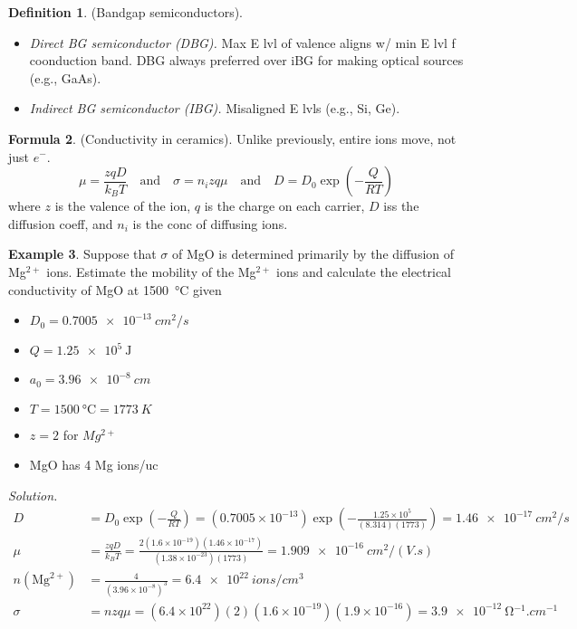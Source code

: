 \documentclass{article}
\theoremstyle{definition}
\newtheorem{definition}{Definition}[section]
\newtheorem{formula}[definition]{Formula}
\newtheorem{example}[definition]{Example}
\begin{document}
\begin{definition}
    (Bandgap semiconductors).
    \begin{itemize}
        \item \textit{Direct BG semiconductor (DBG).} Max E lvl of valence aligns w/ min E lvl f coonduction band. DBG always preferred over iBG for making optical sources (e.g., GaAs).
        \item \textit{Indirect BG semiconductor (IBG).} Misaligned E lvls (e.g., Si, Ge).
    \end{itemize}
\end{definition}

\begin{formula}
    (Conductivity in ceramics). Unlike previously, entire ions move, not just $e^-$.
    \begin{equation}
        \mu = \frac{zqD}{k_B T} \quad \text{and} \quad \sigma = n_i zq \mu \quad \text{and} \quad D = D_0 \exp \left( -\frac{Q}{RT} \right)
    \end{equation}
    where $z$ is the valence of the ion, $q$ is the charge on each carrier, $D$ iss the diffusion coeff, and $n_i$ is the conc of diffusing ions.
\end{formula}

\begin{example}
    Suppose that $\sigma$ of MgO is determined primarily by the diffusion of Mg$^{2+}$ ions. Estimate the mobility of the Mg$^{2+}$ ions and calculate the electrical conductivity of MgO at \SI{1500}{\celsius} given
    \begin{multicols}{3}
        \begin{itemize}
            \item $D_0 = \SI{0.7005e-13}{cm^2/s}$
            \item $Q = \SI{1.25e5}{\joule}$
            \item $a_0 = \SI{3.96e-8}{cm}$
            \item $T = \SI{1500}{\celsius} = \SI{1773}{K}$
            \item $z = 2$ for $Mg^{2+}$
            \item MgO has 4 Mg ions/uc
        \end{itemize}
    \end{multicols}
    \textit{Solution.}
    \begin{align*}
        D &= D_0 \exp\left(-\frac{Q}{RT}\right) = (0.7005 \times 10^{-13}) \exp \left( - \frac{1.25 \times 10^5}{(8.314)(1773)} \right) = \SI{1.46e-17}{cm^2/s} \\
        \mu &= \frac{zqD}{k_BT} = \frac{2(1.6 \times 10^{-19})(1.46 \times 10^{-17})}{(1.38 \times 10^{-23})(1773)} = \SI{1.909e-16}{cm^2/(V.s)} \\
        n(\text{Mg}^{2+}) &= \frac{4}{(3.96 \times 10^{-8})^3} = \SI{6.4e22}{ions/cm^3} \\
        \sigma &= nzq\mu = (6.4\times10^{22})(2)(1.6 \times 10^{-19})(1.9 \times 10^{-16}) = \SI{3.9e-12}{\ohm^{-1}.cm^{-1}}
    \end{align*}
\end{example}
\end{document}
